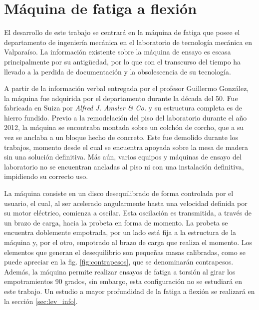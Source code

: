 \newpage

\section{Máquina de fatiga a flexión}
El desarrollo de este trabajo se centrará en la máquina de fatiga que posee el departamento de ingeniería mecánica en el laboratorio de tecnología mecánica en Valparaíso. La información existente sobre la máquina de ensayo es escasa principalmente por su antigüedad, por lo que con el transcurso del tiempo ha llevado a la perdida de documentación y la obsolescencia de su tecnología.  

A partir de la información verbal entregada por el profesor Guillermo González, la máquina fue adquirida por el departamento durante la década del 50. Fue fabricada en Suiza por \textit{Alfred J. Amsler \& Co.} y su estructura completa es de hierro fundido. Previo a la remodelación del piso del laboratorio durante el año 2012, la máquina se encontraba montada sobre un colchón de corcho, que a su vez se anclaba a un bloque hecho de concreto. Este fue demolido durante los trabajos, momento desde el cual se encuentra apoyada sobre la mesa de madera sin una solución definitiva. Más aún, varios equipos y máquinas de ensayo del laboratorio no se encuentran ancladas al piso ni con una instalación definitiva, impidiendo su correcto uso.

La máquina consiste en un disco desequilibrado de forma controlada por el usuario, el cual, al ser acelerado angularmente hasta una velocidad definida por su motor eléctrico, comienza a oscilar. Esta oscilación es transmitida, a través de un brazo de carga, hacia la probeta en forma de momento. La probeta se encuentra doblemente empotrada, por un lado está fija a la estructura de la máquina y, por el otro, empotrado al brazo de carga que realiza el momento. Los elementos que generan el desequilibrio son pequeñas masas calibradas, como se puede apreciar en la fig. \ref{fig:contrapesos}, que se denominarán contrapesos. Además, la máquina permite realizar ensayos de fatiga a torsión al girar los empotramientos 90 grados, sin embargo, esta configuración no se estudiará en este trabajo. Un estudio a mayor profundidad de la fatiga a flexión se realizará en la sección \ref{sec:lev_info}.

